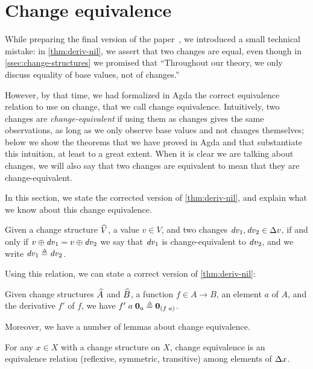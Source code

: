 \section{Change equivalence}
\label{sec:change-eq}

While preparing the final version of the paper~\citep{CaiEtAl2014ILC}, we introduced a
small technical mistake: in \cref{thm:deriv-nil}, we assert that
two changes are equal, even though in
\cref{ssec:change-structures} we promised that ``Throughout
our theory, we only discuss equality of base values, not of
changes.''

However, by that time, we had formalized in Agda the correct
equivalence relation to use on change, that we call change
equivalence. Intuitively, two changes are
\emph{change-equivalent} if using them as changes gives the same
observations, as long as we only observe base values and not
changes themselves; below we show the theorems that we have
proved in Agda and that substantiate this intuition, at least to
a great extent. When it is clear we are talking about changes, we
will also say that two changes are equivalent to mean that they
are change-equivalent.

In this section, we
state the corrected version of \cref{thm:deriv-nil}, and explain
what we know about this change equivalence.

\begin{definition}
  Given a change structure $\widehat{V}$, a value $v \in V$,
  and two changes $\D v_1, \D v_2 \in \Change{v}$, if and only if
  $\Update{v}{\D v_1} = \Update{v}{\D v_2}$ we say that $\mathit{dv}_1$
  is change-equivalent to $\mathit{dv}_2$, and
  we write $\D v_1 \Doe \D v_2$.
\end{definition}

Using this relation, we can state a correct version of
\cref{thm:deriv-nil}:

\begin{lemma}
  \label{thm:deriv-nil-2}
  Given change structures $\widehat{A}$ and
  $\widehat{B}$, a function $f \in A \to B$, an element $a$
  of $A$, and the derivative $f'$ of $f$, we have
  $\App{\App{f'}{a}}{\NilC{a}} \Doe \NilC{\App* f a}$.
\end{lemma}

Moreover, we have a number of lemmas about change
equivalence.


\begin{lemma}
  For any $x \in X$ with a change structure on $X$, change equivalence is an
  equivalence relation (reflexive, symmetric, transitive) among
  elements of $\Change{x}$.
\end{lemma}

